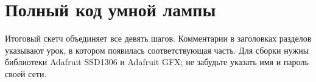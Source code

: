 \section{Полный код умной лампы}
Итоговый скетч объединяет все девять шагов. Комментарии в заголовках разделов указывают урок,
в котором появилась соответствующая часть. Для сборки нужны библиотеки Adafruit SSD1306 и Adafruit GFX;
не забудьте указать имя и пароль своей сети.

